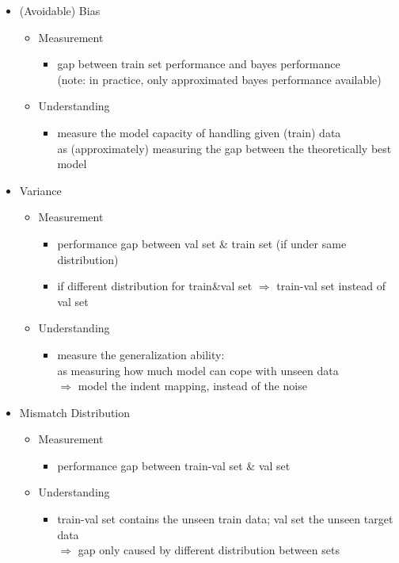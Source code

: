 \begin{itemize}
\item (Avoidable) Bias
	\begin{itemize}
	\item Measurement
		\begin{itemize}
		\item gap between train set performance and bayes performance \\
		(note: in practice, only approximated bayes performance available)
		\end{itemize}
	\item Understanding
		\begin{itemize}
		\item measure the model capacity of handling given (train) data \\
		as (approximately) measuring the gap between the theoretically best model
		\end{itemize}
	\end{itemize}

\item Variance
	\begin{itemize}
	\item Measurement
		\begin{itemize}
		\item performance gap between val set \& train set (if under same distribution)
		\item if different distribution for train\&val set $\Rightarrow$ train-val set instead of val set
		\end{itemize}
	\item Understanding
		\begin{itemize}
		\item measure the generalization ability: \\ 
		as measuring how much model can cope with unseen data \\ 
		$\Rightarrow$ model the indent mapping, instead of the noise
		\end{itemize}
	\end{itemize}

\item Mismatch Distribution
	\begin{itemize}
	\item Measurement
		\begin{itemize}
		\item performance gap between train-val set \& val set
		\end{itemize}
	\item Understanding
		\begin{itemize}
		\item train-val set contains the unseen train data; val set the unseen target data \\
		$\Rightarrow$ gap only caused by different distribution between sets
		\end{itemize}
	\end{itemize}
\end{itemize}


